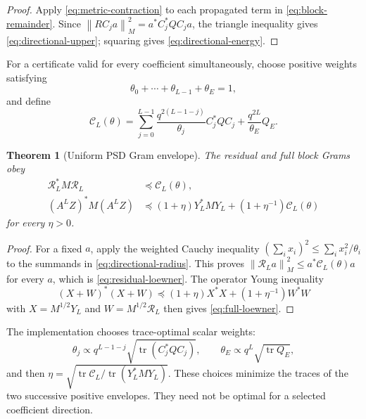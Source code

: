 \documentclass[11pt]{article}
\newtheorem{theorem}{Theorem}[section]
\newcommand{\norm}[1]{\left\lVert#1\right\rVert}
\begin{document}
\begin{proof}
Apply \eqref{eq:metric-contraction} to each propagated term in
\eqref{eq:block-remainder}.  Since
$\norm{RC_ja}_M^2=a^*C_j^*QC_ja$, the triangle inequality gives
\eqref{eq:directional-upper}; squaring gives
\eqref{eq:directional-energy}.
\end{proof}

For a certificate valid for every coefficient simultaneously, choose
positive weights satisfying
\[
 \theta_0+\cdots+\theta_{L-1}+\theta_E=1,
\]
and define
\begin{equation}
 \mathcal C_L(\theta)=
 \sum_{j=0}^{L-1}
 \frac{q^{2(L-1-j)}}{\theta_j}C_j^*QC_j
 +\frac{q^{2L}}{\theta_E}Q_E.
 \label{eq:residual-envelope}
\end{equation}

\begin{theorem}[Uniform PSD Gram envelope]
\label{thm:gram}
The residual and full block Grams obey
\begin{align}
 \mathcal R_L^*M\mathcal R_L
 &\preceq \mathcal C_L(\theta),
 \label{eq:residual-loewner}\\
 (A^LZ)^*M(A^LZ)
 &\preceq
 (1+\eta)Y_L^*MY_L+(1+\eta^{-1})\mathcal C_L(\theta)
 \label{eq:full-loewner}
\end{align}
for every $\eta>0$.
\end{theorem}

\begin{proof}
For a fixed $a$, apply the weighted Cauchy inequality
$(\sum_i x_i)^2\le\sum_i x_i^2/\theta_i$ to the summands in
\eqref{eq:directional-radius}.  This proves
$\norm{\mathcal R_La}_M^2\le a^*\mathcal C_L(\theta)a$ for every $a$, which
is \eqref{eq:residual-loewner}.  The operator Young inequality
\[
 (X+W)^*(X+W)\preceq
 (1+\eta)X^*X+(1+\eta^{-1})W^*W
\]
with $X=M^{1/2}Y_L$ and $W=M^{1/2}\mathcal R_L$ then gives
\eqref{eq:full-loewner}.
\end{proof}

The implementation chooses trace-optimal scalar weights:
\begin{equation}
 \theta_j\propto q^{L-1-j}
 \sqrt{\operatorname{tr}(C_j^*QC_j)},
 \qquad
 \theta_E\propto q^L\sqrt{\operatorname{tr}Q_E},
 \label{eq:trace-weights}
\end{equation}
and then
$\eta=\sqrt{\operatorname{tr}\mathcal C_L/
\operatorname{tr}(Y_L^*MY_L)}$.  These choices minimize the traces of the
two successive positive envelopes.  They need not be optimal for a selected
coefficient direction.
\end{document}
